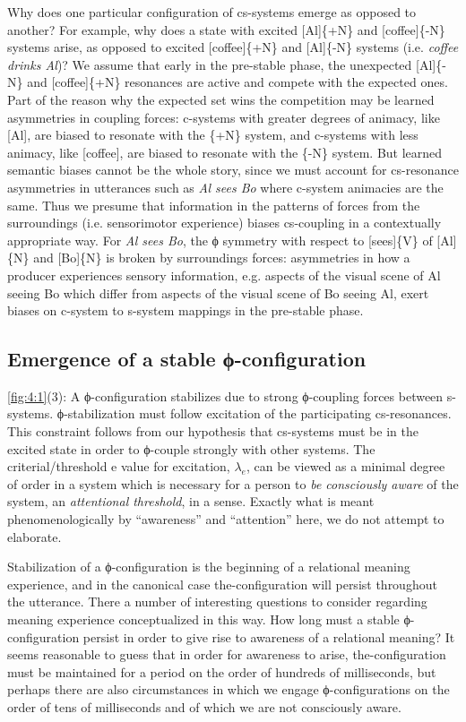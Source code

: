   Why does one particular configuration of cs-systems emerge as opposed to another? For example, why does a state with excited [Al]\{+N\} and [coffee]\{-N\} systems arise, as opposed to excited [coffee]\{+N\} and [Al]\{-N\} systems (i.e. \textit{coffee drinks Al})? We assume that early in the pre-stable phase, the unexpected [Al]\{-N\} and [coffee]\{+N\} resonances are active and compete with the expected ones. Part of the reason why the expected set wins the competition may be learned asymmetries in coupling forces: c-systems with greater degrees of animacy, like [Al], are biased to resonate with the \{+N\} system, and c-systems with less animacy, like [coffee], are biased to resonate with the \{-N\} system. But learned semantic biases cannot be the whole story, since we must account for cs-resonance asymmetries in utterances such as \textit{Al sees Bo} where c-system animacies are the same. Thus we presume that information in the patterns of forces from the surroundings (i.e. sensorimotor experience) biases cs-coupling in a contextually appropriate way. For \textit{Al sees Bo}, the ϕ symmetry with respect to [sees]\{V\} of [Al]\{N\} and [Bo]\{N\} is broken by surroundings forces: asymmetries in how a producer experiences sensory information, e.g. aspects of the visual scene of Al seeing Bo which differ from aspects of the visual scene of Bo seeing Al, exert biases on c-system to s-system mappings in the pre-stable phase.

\subsection{Emergence of a stable ϕ-configuration}

\ref{fig:4:1}(3): A ϕ-configuration stabilizes due to strong ϕ{}-coupling forces between s-systems. ϕ{}-stabilization must follow excitation of the participating cs-resonances. This constraint follows from our hypothesis that cs-systems must be in the excited state in order to ϕ-couple strongly with other systems. The criterial/threshold e value for excitation, $\lambda_{e}$, can be viewed as a minimal degree of order in a system which is necessary for a person to \textit{be consciously aware} of the system, an \textit{attentional threshold}, in a sense. Exactly what is meant phenomenologically by “awareness” and “attention” here, we do not attempt to elaborate. 

   Stabilization of a ϕ-configuration is the beginning of a relational meaning experience, and in the canonical case the-configuration will persist throughout the utterance. There a number of interesting questions to consider regarding meaning experience conceptualized in this way. How long must a stable ϕ-configuration persist in order to give rise to awareness of a relational meaning? It seems reasonable to guess that in order for awareness to arise, the-configuration must be maintained for a period on the order of hundreds of milliseconds, but perhaps there are also circumstances in which we engage ϕ-configurations on the order of tens of milliseconds and of which we are not consciously aware.

